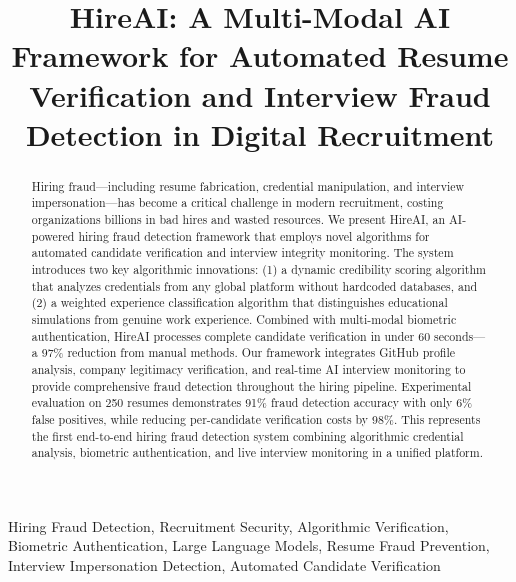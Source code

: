\documentclass[journal]{IEEEtran}
\begin{document}
\title{HireAI: A Multi-Modal AI Framework for Automated Resume Verification and Interview Fraud Detection in Digital Recruitment}

\author{
}

\maketitle

\begin{abstract}
Hiring fraud—including resume fabrication, credential manipulation, and interview impersonation—has become a critical challenge in modern recruitment, costing organizations billions in bad hires and wasted resources. We present HireAI, an AI-powered hiring fraud detection framework that employs novel algorithms for automated candidate verification and interview integrity monitoring. The system introduces two key algorithmic innovations: (1) a dynamic credibility scoring algorithm that analyzes credentials from any global platform without hardcoded databases, and (2) a weighted experience classification algorithm that distinguishes educational simulations from genuine work experience. Combined with multi-modal biometric authentication, HireAI processes complete candidate verification in under 60 seconds—a 97\% reduction from manual methods. Our framework integrates GitHub profile analysis, company legitimacy verification, and real-time AI interview monitoring to provide comprehensive fraud detection throughout the hiring pipeline. Experimental evaluation on 250 resumes demonstrates 91\% fraud detection accuracy with only 6\% false positives, while reducing per-candidate verification costs by 98\%. This represents the first end-to-end hiring fraud detection system combining algorithmic credential analysis, biometric authentication, and live interview monitoring in a unified platform.
\end{abstract}

\begin{IEEEkeywords}
Hiring Fraud Detection, Recruitment Security, Algorithmic Verification, Biometric Authentication, Large Language Models, Resume Fraud Prevention, Interview Impersonation Detection, Automated Candidate Verification
\end{IEEEkeywords}
\end{document}
